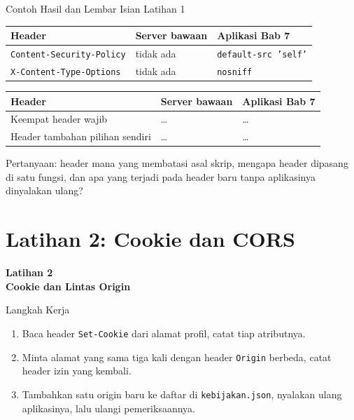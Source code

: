 \documentclass[aspectratio=169, table, 12pt]{beamer}
\begin{document}
\begin{frame}{{\Large Contoh Hasil dan Lembar Isian Latihan 1}}
  \vspace{4pt}
  \centering
  {\footnotesize
  \begin{tabularx}{\textwidth}{Yll}
    \hline
    \textbf{Header} & \textbf{Server bawaan} & \textbf{Aplikasi Bab 7} \\
    \hline
    \texttt{Content-Security-Policy} & tidak ada & \texttt{default-src 'self'} \\
    \hline
    \texttt{X-Content-Type-Options} & tidak ada & \texttt{nosniff} \\
    \hline
  \end{tabularx}}

  \vspace{6pt}
  \centering
  {\footnotesize
  \begin{tabularx}{\textwidth}{Yll}
    \hline
    \textbf{Header} & \textbf{Server bawaan} & \textbf{Aplikasi Bab 7} \\
    \hline
    Keempat header wajib & \dots & \dots \\
    \hline
    Header tambahan pilihan sendiri & \dots & \dots \\
    \hline
  \end{tabularx}}

  \vspace{4pt}
  {\footnotesize Pertanyaan: header mana yang membatasi asal skrip, mengapa
  header dipasang di satu fungsi, dan apa yang terjadi pada header baru tanpa
  aplikasinya dinyalakan ulang?}
\end{frame}

\section{Latihan 2: Cookie dan CORS}

\begin{frame}{\hfill}
  \centering
  \Huge{\textbf{Latihan 2\\Cookie dan Lintas Origin}}
\end{frame}

\begin{frame}{{\Large Langkah Kerja}}
  \vspace{8pt}
  \begin{enumerate}
    \item Baca header \texttt{Set-Cookie} dari alamat profil, catat tiap
          atributnya.
    \item Minta alamat yang sama tiga kali dengan header \texttt{Origin}
          berbeda, catat header izin yang kembali.
    \item Tambahkan satu origin baru ke daftar di \texttt{kebijakan.json},
          nyalakan ulang aplikasinya, lalu ulangi pemeriksaannya.
  \end{enumerate}
\end{frame}
\end{document}
